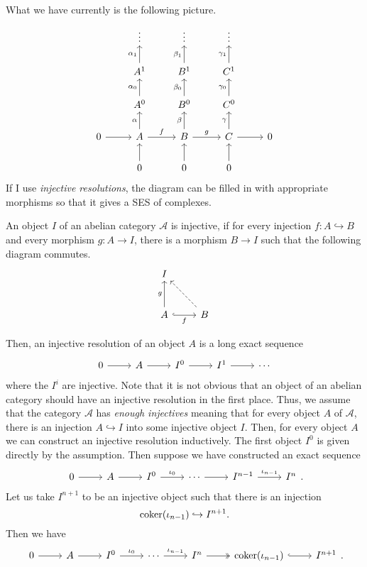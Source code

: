 What we have currently is the following picture.
\[\begin{tikzcd}
    & \vdots & \vdots & \vdots & \\
    & A^{1}\uar{\alpha_{1}} & B^{1}\uar{\beta_{1}} & C^{1}\uar{\gamma_{1}} & \\
    & A^{0}\uar{\alpha_{0}} & B^{0}\uar{\beta_{0}} & C^{0}\uar{\gamma_{0}} & \\
    0\rar& A\rar{f}\uar{\alpha} & B\rar{g}\uar{\beta} & C\rar\uar{\gamma}&0\\
    & 0\uar & 0\uar & 0\uar &
  \end{tikzcd}\]
If I use \emph{injective resolutions}, the diagram can be filled in with
appropriate morphisms so that it gives a SES of complexes.
\begin{defin}
  An object $I$ of an abelian category $\mathcal{A}$ is injective,
  if for every injection $f:A\hookrightarrow B$ and every morphism
  $g:A\to I$, there is a morphism $B\to I$ such that the following
  diagram commutes.
  \[\begin{tikzcd}[row sep=large]
      I & \\ A\uar{g}\arrow[r, hook, "f"'] & B\ular[dashed]
    \end{tikzcd}\]
\end{defin}
Then, an injective resolution of an object $A$ is a long exact sequence
\[\begin{tikzcd}
    0\rar & A\rar & I^{0}\rar & I^{1}\rar & \cdots
  \end{tikzcd}\]
where the $I^{i}$ are injective. Note that it is not obvious that an object
of an abelian category should have an injective resolution in the first
place. Thus, we assume that the category $\mathcal{A}$ has
\emph{enough injectives} meaning that for every object $A$ of $\mathcal{A}$,
there is an injection $A\hookrightarrow I$ into some injective object $I$.
Then, for every object $A$ we can construct an injective resolution
inductively. The first object $I^{0}$ is given directly by the assumption.
Then suppose we have constructed an exact sequence
\[\begin{tikzcd}
    0\rar & A\rar & I^{0}\rar{\iota_{0}} & \cdots\rar
    & I^{n-1}\rar{\iota_{n-1}} & I^{n}
  \end{tikzcd}.\]
Let us take $I^{n+1}$ to be an injective object such that there is
an injection
\[\operatorname{coker}(\iota_{n-1})\hookrightarrow I^{n+1}.\]
Then we have
\[\begin{tikzcd}
    0\rar & A\rar & I^{0}\rar{\iota_{0}} & \cdots\rar{\iota_{n-1}}
    & I^{n}\rar[two heads] & \coker(\iota_{n-1})\rar[hook] & I^{n+1}
  \end{tikzcd}.\]
